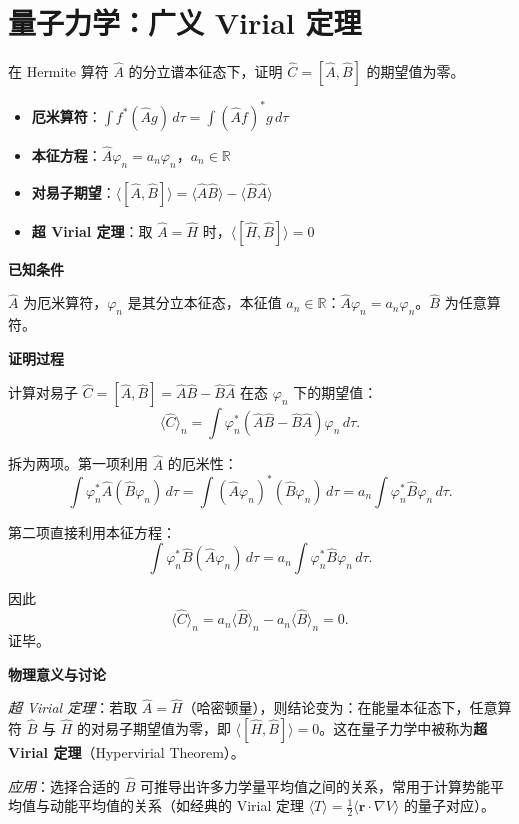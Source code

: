 \section{量子力学：广义 Virial 定理}
\label{sec:hypervirial-theorem}

\begin{modelbox}
在 Hermite 算符 $\hat A$ 的分立谱本征态下，证明 $\hat C=[\hat A,\hat B]$ 的期望值为零。
\end{modelbox}

\begin{tipbox}[考点快速分析]
\begin{itemize}
    \item \textbf{厄米算符}：$\int f^*(\hat A g)\,d\tau=\int(\hat A f)^*g\,d\tau$
    \item \textbf{本征方程}：$\hat A\varphi_n=a_n\varphi_n$，$a_n\in\mathbb{R}$
    \item \textbf{对易子期望}：$\langle[\hat A,\hat B]\rangle=\langle\hat A\hat B\rangle-\langle\hat B\hat A\rangle$
    \item \textbf{超 Virial 定理}：取 $\hat A=\hat H$ 时，$\langle[\hat H,\hat B]\rangle=0$
\end{itemize}
\end{tipbox}

\begin{derivationbox}[标准解题过程]
\textbf{已知条件}

$\hat A$ 为厄米算符，$\varphi_n$ 是其分立本征态，本征值 $a_n\in\mathbb{R}$：$\hat A\varphi_n=a_n\varphi_n$。$\hat B$ 为任意算符。

\textbf{证明过程}

计算对易子 $\hat C=[\hat A,\hat B]=\hat A\hat B-\hat B\hat A$ 在态 $\varphi_n$ 下的期望值：
\[
\langle\hat C\rangle_n=\int\varphi_n^*(\hat A\hat B-\hat B\hat A)\varphi_n\,d\tau.
\]

拆为两项。第一项利用 $\hat A$ 的厄米性：
\[
\int\varphi_n^*\hat A(\hat B\varphi_n)\,d\tau=\int(\hat A\varphi_n)^*(\hat B\varphi_n)\,d\tau=a_n\int\varphi_n^*\hat B\varphi_n\,d\tau.
\]

第二项直接利用本征方程：
\[
\int\varphi_n^*\hat B(\hat A\varphi_n)\,d\tau=a_n\int\varphi_n^*\hat B\varphi_n\,d\tau.
\]

因此
\begin{equation}
\boxed{\langle\hat C\rangle_n=a_n\langle\hat B\rangle_n-a_n\langle\hat B\rangle_n=0.}
\end{equation}
证毕。

\textbf{物理意义与讨论}

\textit{超 Virial 定理}：若取 $\hat A=\hat H$（哈密顿量），则结论变为：在能量本征态下，任意算符 $\hat B$ 与 $\hat H$ 的对易子期望值为零，即 $\langle[\hat H,\hat B]\rangle=0$。这在量子力学中被称为\textbf{超 Virial 定理}（Hypervirial Theorem）。

\textit{应用}：选择合适的 $\hat B$ 可推导出许多力学量平均值之间的关系，常用于计算势能平均值与动能平均值的关系（如经典的 Virial 定理 $\langle T\rangle=\frac{1}{2}\langle\mathbf{r}\cdot\nabla V\rangle$ 的量子对应）。
\end{derivationbox}

